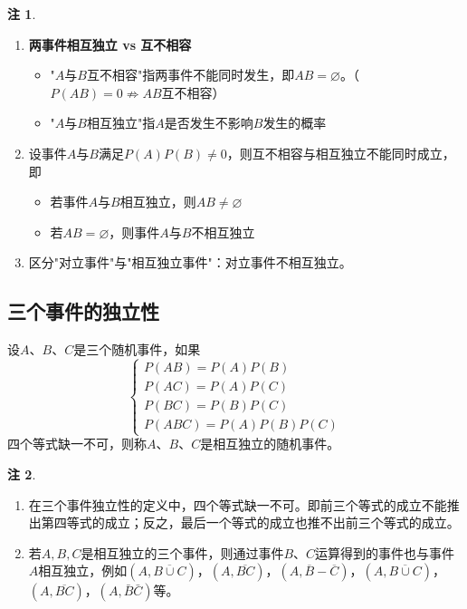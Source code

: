 \documentclass[11pt,a4paper]{report}
\theoremstyle{definition}
\newtheorem{remark}{注}[chapter]
\theoremstyle{plain}
\begin{document}
\begin{remark}
\begin{enumerate}[label=\arabic*.,leftmargin=2em]
    \item \textbf{两事件相互独立 vs 互不相容}
    \begin{itemize}
        \item "$A$与$B$互不相容"指两事件不能同时发生，即$AB=\varnothing$。（$P(AB)=0\nRightarrow AB$互不相容）
        \item "$A$与$B$相互独立"指$A$是否发生不影响$B$发生的概率
    \end{itemize}
    \item 设事件$A$与$B$满足$P(A)P(B)\neq0$，则互不相容与相互独立不能同时成立，即
    \begin{itemize}
        \item 若事件$A$与$B$相互独立，则$AB\neq\varnothing$
        \item 若$AB=\varnothing$，则事件$A$与$B$不相互独立
    \end{itemize}
    \item 区分"对立事件"与"相互独立事件"：对立事件不相互独立。
\end{enumerate}
\end{remark}

\subsection{三个事件的独立性}

设$A$、$B$、$C$是三个随机事件，如果
\[
\begin{cases}
P(AB)=P(A)P(B)\\
P(AC)=P(A)P(C)\\
P(BC)=P(B)P(C)\\
P(ABC)=P(A)P(B)P(C)
\end{cases}
\]
四个等式缺一不可，则称$A$、$B$、$C$是相互独立的随机事件。

\begin{remark}
\begin{enumerate}[label=\arabic*.,leftmargin=2em]
    \item 在三个事件独立性的定义中，四个等式缺一不可。即前三个等式的成立不能推出第四等式的成立；反之，最后一个等式的成立也推不出前三个等式的成立。
    \item 若$A,B,C$是相互独立的三个事件，则通过事件$B$、$C$运算得到的事件也与事件$A$相互独立，例如$(A,\overline{B\cup C})$，$(A,\overline{BC})$，$(A,\overline{B}-\overline{C})$，$(A,\overline{B\cup C})$，$(A,\overline{BC})$，$(A,\bar{B}\bar{C})$等。
\end{enumerate}
\end{remark}
\end{document}
